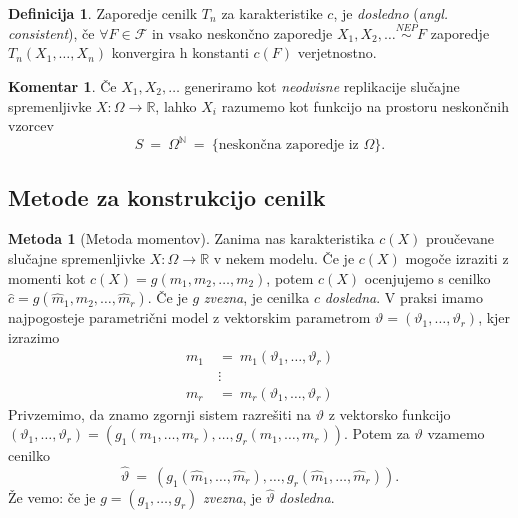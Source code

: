 \documentclass[11pt]{article}
\newcommand{\R}{\mathbb{R}}
\newcommand{\1}{\mathbbm{1}}
\newcommand{\N}{\mathbb{N}}
\newcommand{\F}{\mathcal{F}}
\theoremstyle{definition}
\newtheorem{definicija}{Definicija}[section]
\theoremstyle{definition}
\theoremstyle{definition}
\newtheorem*{komentar}{Komentar}
\newtheorem{metoda}{Metoda}
\begin{document}
\begin{definicija}

Zaporedje cenilk $T_n$ za karakteristike $c$, je \textit{dosledno} (\textit{angl. consistent}), če $\forall F \in \F$ in vsako neskončno zaporedje $X_1, X_2, \ldots \overset{NEP}{\sim} F$ zaporedje $T_n(X_1, \ldots, X_n)$ konvergira h konstanti $c(F)$ verjetnostno. 
\end{definicija}
\vspace{0.5cm}

\begin{komentar}

Če $X_1, X_2, \ldots$ generiramo kot \textit{neodvisne} replikacije slučajne spremenljivke $X:\Omega \rightarrow \R$, lahko $X_i$ razumemo kot funkcijo na prostoru neskončnih vzorcev
$$S ~=~ \Omega^\N ~=~ \{\text{neskončna zaporedje iz $\Omega$}\}.$$

\end{komentar}
\vspace{0.5cm}


\subsection{Metode za konstrukcijo cenilk}
\vspace{0.5cm}

\begin{metoda}[Metoda momentov]

Zanima nas karakteristika $c(X)$ proučevane slučajne spremenljivke $X: \Omega \rightarrow \R$ v nekem modelu. Če je $c(X)$ mogoče izraziti z momenti kot $c(X) = g(m_1, m_2, \ldots, m_2)$, potem $c(X)$ ocenjujemo s cenilko $\hat{c} = g(\hat{m}_1, \hat{m}_2, \ldots, \hat{m}_r)$. Če je $g$ \textit{zvezna}, je cenilka $\hat{c}$ \textit{dosledna}. V praksi imamo najpogosteje parametrični model z vektorskim parametrom $\vartheta = (\vartheta_1, \ldots, \vartheta_r)$, kjer izrazimo 
\begin{align*}
m_1 ~&=~ m_1(\vartheta_1, \ldots, \vartheta_r) \\
&\vdots \\
m_r ~&=~ m_r(\vartheta_1, \ldots, \vartheta_r) 
\end{align*}
Privzemimo, da znamo zgornji sistem razrešiti na $\vartheta$ z vektorsko funkcijo $(\vartheta_1, \ldots, \vartheta_r) = (g_1(m_1, \ldots, m_r), \ldots, g_r(m_1, \ldots, m_r))$. Potem za $\vartheta$ vzamemo cenilko
$$\hat{\vartheta} ~=~ (g_1(\hat{m}_1, \ldots, \hat{m}_r), \ldots, g_r(\hat{m}_1, \ldots, \hat{m}_r)).$$
Že vemo: če je $g = (g_1, \ldots, g_r)$ \textit{zvezna}, je $\hat{\vartheta}$ \textit{dosledna}.

\end{metoda}
\vspace{0.5cm}
\end{document}
